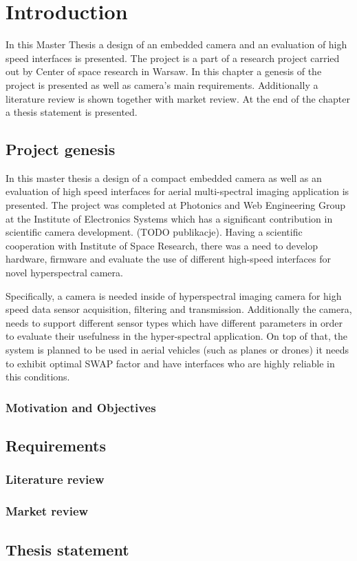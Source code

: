 \pagestyle{plain}
\chapter{Introduction}
In this Master Thesis a design of an embedded camera and an evaluation of high speed interfaces is presented. The project is a part of a research project carried out by Center of space research in Warsaw. In this chapter a genesis of the project is presented as well as camera's main requirements. Additionally a literature review is shown together with market review. At the end of the chapter a thesis statement is presented.


\lipsum[3-56]
\section{Project genesis}

In this master thesis a design of a compact embedded camera as well as an evaluation of high speed interfaces for aerial multi-spectral imaging application is presented. 
The project was completed at Photonics and Web Engineering Group at the Institute of 
Electronics Systems which has a significant contribution in scientific camera development. (TODO publikacje).  Having a scientific cooperation with
Institute of Space Research, there was a need to develop hardware, firmware and evaluate the use of different high-speed interfaces for novel hyperspectral camera.

Specifically, a camera is needed inside of hyperspectral imaging camera for high speed data sensor acquisition, filtering and transmission. Additionally the camera, needs to support different sensor types which have different parameters in order to evaluate their usefulness in the hyper-spectral application. On top of that, the system is planned to be used in aerial vehicles (such as planes or drones) it needs to exhibit optimal SWAP factor and have interfaces who are highly reliable in this conditions. 

\subsection{Motivation and Objectives}
\section{Requirements}
\subsection{Literature review}
\subsection{Market review} 

\section{Thesis statement} 
